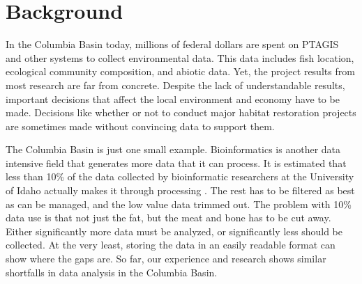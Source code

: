 

 


\section{Background}
In the Columbia Basin today, millions of federal dollars are spent on PTAGIS
and other systems to collect environmental data.  This data includes fish
location, ecological community composition, and abiotic data. Yet, the project
results from most research are far from concrete. Despite the lack of
understandable results, important decisions that affect the local environment
and economy have to be made. Decisions like whether or not to conduct major
habitat restoration projects are sometimes made without convincing data to
support them. 

The Columbia Basin is just one small example. Bioinformatics is another 
data intensive field that generates more data that it can process. It is 
estimated that less than 10\% of the data collected by bioinformatic 
researchers at the University of Idaho actually makes it through processing
\cite{foster}. The rest has to be filtered as best as can be managed, and the 
low value data trimmed out. The problem with 10\% data use is that not just 
the fat, but the meat and bone has to be cut away. Either significantly more
data must be analyzed, or significantly less should be collected. At the very
least, storing the data in an easily readable format can show where the 
gaps are. So far, our experience and research shows similar shortfalls in 
data analysis in the Columbia Basin.


